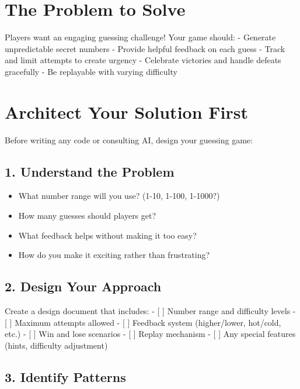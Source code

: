\documentclass[
  letterpaper,
  DIV=11,
  numbers=noendperiod,
  oneside]{scrreprt}
\providecommand{\tightlist}{%
  \setlength{\itemsep}{0pt}\setlength{\parskip}{0pt}}\usepackage{longtable,booktabs,array}
\begin{document}
\section{The Problem to Solve}\label{the-problem-to-solve-2}

Players want an engaging guessing challenge! Your game should: -
Generate unpredictable secret numbers - Provide helpful feedback on each
guess - Track and limit attempts to create urgency - Celebrate victories
and handle defeats gracefully - Be replayable with varying difficulty

\section{Architect Your Solution
First}\label{architect-your-solution-first-2}

Before writing any code or consulting AI, design your guessing game:

\subsection{1. Understand the Problem}\label{understand-the-problem-2}

\begin{itemize}
\tightlist
\item
  What number range will you use? (1-10, 1-100, 1-1000?)
\item
  How many guesses should players get?
\item
  What feedback helps without making it too easy?
\item
  How do you make it exciting rather than frustrating?
\end{itemize}

\subsection{2. Design Your Approach}\label{design-your-approach-2}

Create a design document that includes: - {[} {]} Number range and
difficulty levels - {[} {]} Maximum attempts allowed - {[} {]} Feedback
system (higher/lower, hot/cold, etc.) - {[} {]} Win and lose scenarios -
{[} {]} Replay mechanism - {[} {]} Any special features (hints,
difficulty adjustment)

\subsection{3. Identify Patterns}\label{identify-patterns-2}
\end{document}
